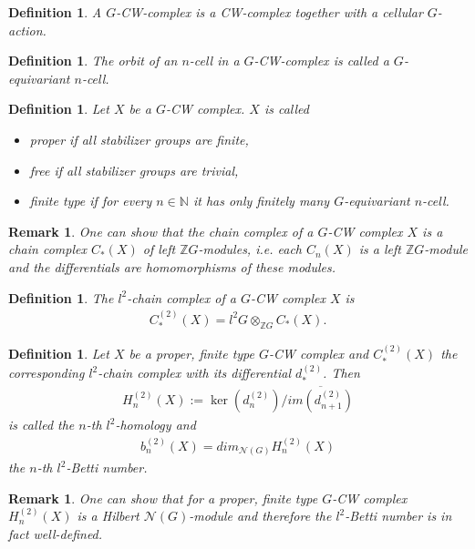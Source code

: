 \documentclass[12pt,a4paper]{scrartcl}
\newtheorem{Definition}[Theorem]{Definition}
\newtheorem{Remark}[Theorem]{Remark}
\numberwithin{equation}{section}
\newcommand{\Z}{\mathbb{Z}} %
\newcommand{\N}{\mathbb{N}} %
\newcommand{\2}{\mathbb{Z} / 2 \mathbb{Z}}
\newcommand{\1}{\bar{1}}
\newcommand{\0}{\bar{0}}
\begin{document}
\begin{Definition}
	A $G$-CW-complex is a CW-complex together with a cellular $G$-action.
\end{Definition}

\begin{Definition}
	The orbit of an $n$-cell in a $G$-CW-complex is called a $G$-equivariant $n$-cell.
\end{Definition}

\begin{Definition}
	Let $X$ be a $G$-CW complex. $X$ is called
	\begin{itemize}
		\item proper if all stabilizer groups are finite,
		\item free if all stabilizer groups are trivial,
		\item finite type if for every $n \in \N$ it has only finitely many $G$-equivariant $n$-cell.
	\end{itemize}
\end{Definition}
\begin{Remark}
	One can show that the chain complex of a $G$-CW complex $X$ is a chain complex $C_*(X)$ of left $\Z G$-modules, i.e. each $C_n(X)$ is a left $\Z G$-module and the differentials are homomorphisms of these modules.
\end{Remark}
\begin{Definition}
	The $l^2$-chain complex of a $G$-CW complex $X$ is
	\begin{align*}
		C_*^{(2)}(X) = l^2G \otimes_{\Z G} C_*(X).
	\end{align*}
\end{Definition}

\begin{Definition}
	Let $X$ be a proper, finite type $G$-CW complex and $C_*^{(2)}(X)$ the corresponding $l^2$-chain complex with its differential $d_*^{(2)}$. Then 
	\begin{align*}
		H_n^{(2)}(X) := \ker(d_n^{(2)}) / \overline{im(d_{n+1}^{(2)})}
	\end{align*}
	is called the $n$-th $l^2$-homology and 
	\begin{align*}
		b_n^{(2)}(X)=dim_{\mathcal{N}(G)}H_n^{(2)}(X)
	\end{align*}
	the $n$-th $l^2$-Betti number.
\end{Definition}
\begin{Remark}
	One can show that for a proper, finite type $G$-CW complex $H_n^{(2)}(X)$ is a Hilbert $\mathcal{N}(G)$-module and therefore the $l^2$-Betti number is in fact well-defined.
\end{Remark}
\end{document}
